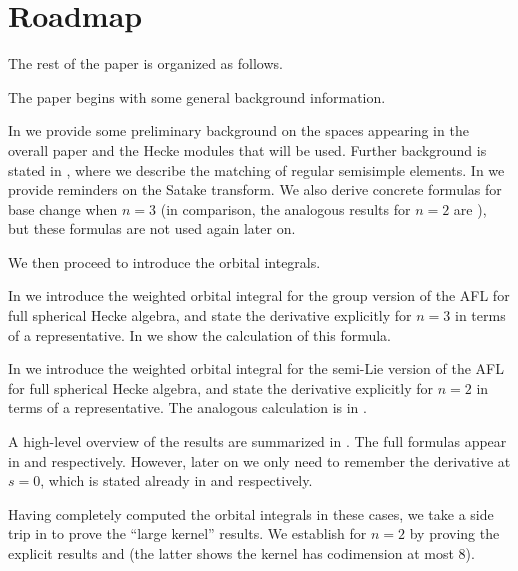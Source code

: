 \section{Roadmap}
The rest of the paper is organized as follows.

\begin{itemize}
  \ii The paper begins with some general background information.
  \begin{itemize}
    \ii In  we provide some preliminary background
    on the spaces appearing in the overall paper and the Hecke modules that will be used.
    \ii Further background is stated in ,
    where we describe the matching of regular semisimple elements.
    \ii In  we provide reminders on the Satake transform.
    We also derive concrete formulas for base change when $n = 3$
    (in comparison, the analogous results for $n=2$ are
    \cite[Lemma 7.1.1]{ref:AFLspherical}),
    but these formulas are not used again later on.
  \end{itemize}

  \ii We then proceed to introduce the orbital integrals.
  \begin{itemize}
    \ii In  we introduce the weighted orbital integral
    for the group version of the AFL for full spherical Hecke algebra,
    and state the derivative explicitly for $n = 3$ in terms of a representative.
    In  we show the calculation of this formula.

    \ii In  we introduce the weighted orbital integral
    for the semi-Lie version of the AFL for full spherical Hecke algebra,
    and state the derivative explicitly for $n = 2$ in terms of a representative.
    The analogous calculation is in .
  \end{itemize}
  A high-level overview of the results are summarized in .
  The full formulas appear in  and  respectively.
  However, later on we only need to remember the derivative at $s = 0$,
  which is stated already in  and  respectively.

  \ii Having completely computed the orbital integrals in these cases,
  we take a side trip in  to prove the ``large kernel'' results.
  We establish  for $n = 2$
  by proving the explicit results
   and 
  (the latter shows the kernel has codimension at most $8$).


\end{itemize}
